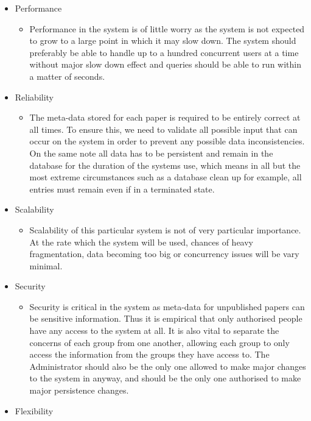 \documentclass{article}
\begin{document}
		\begin{itemize}
			\item Performance
			\begin{itemize}
				\item Performance in the system is of little worry as the system is not expected to grow to a large point in which it may slow down. The system should preferably be able to handle up to a hundred concurrent users at a time without major slow down effect and queries should be able to run within a matter of seconds.
			\end{itemize}
			\item Reliability
			\begin{itemize}
				\item The meta-data stored for each paper is required to be entirely correct at all times. To ensure this, we need to validate all possible input that can occur on the system in order to prevent any possible data inconsistencies. On the same note all data has to be persistent and remain in the database for the duration of the systems use, which means in all but the most extreme circumstances such as a database clean up for example, all entries must remain even if in a terminated state.
			\end{itemize}
			\item Scalability
			\begin{itemize}
				\item Scalability of this particular system is not of very particular importance. At the rate which the system will be used, chances of heavy fragmentation, data becoming too big or concurrency issues will be vary minimal.
			\end{itemize}
			\item Security
			\begin{itemize}
				\item Security is critical in the system as meta-data for unpublished papers can be sensitive information. Thus it is empirical that only authorised people have any access to the system at all. It is also vital to separate the concerns of each group from one another, allowing each group to only access the information from the groups they have access to. The Administrator should also be the only one allowed to make major changes to the system in anyway, and should be the only one authorised to make major persistence changes. 
			\end{itemize}
			\item Flexibility
			\begin{itemize}

\end{itemize}
\end{itemize}
\end{document}
